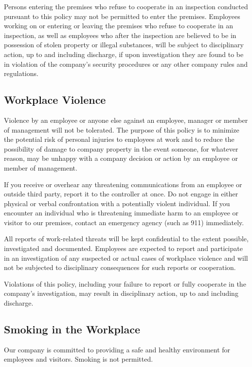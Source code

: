 \documentclass{book}
\begin{document}
Persons entering the premises who refuse to cooperate in an inspection conducted pursuant to this policy may not be permitted to enter the premises. Employees working on or entering or leaving the premises who refuse to cooperate in an inspection, as well as employees who after the inspection are believed to be in possession of stolen property or illegal substances, will be subject to disciplinary action, up to and including discharge, if upon investigation they are found to be in violation of the company's security procedures or any other company rules and regulations.

\subsection{Workplace Violence}

Violence by an employee or anyone else against an employee, manager or member of management will not be tolerated. The purpose of this policy is to minimize the potential risk of personal injuries to employees at work and to reduce the possibility of damage to company property in the event someone, for whatever reason, may be unhappy with a company decision or action by an employee or member of management.

If you receive or overhear any threatening communications from an employee or outside third party, report it to the controller at once. Do not engage in either physical or verbal confrontation with a potentially violent individual. If you encounter an individual who is threatening immediate harm to an employee or visitor to our premises, contact an emergency agency (such as 911) immediately.

All reports of work-related threats will be kept confidential to the extent possible, investigated and documented. Employees are expected to report and participate in an investigation of any suspected or actual cases of workplace violence and will not be subjected to disciplinary consequences for such reports or cooperation.

Violations of this policy, including your failure to report or fully cooperate in the company's investigation, may result in disciplinary action, up to and including discharge.

\subsection{Smoking in the Workplace}

Our company is committed to providing a safe and healthy environment for employees and visitors. Smoking is not permitted.
\end{document}

